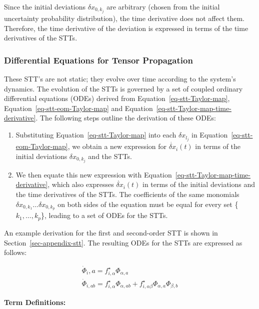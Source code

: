 \documentclass[
  letterpaper,
  DIV=11,
  numbers=noendperiod,
  oneside]{scrartcl}
\begin{document}
Since the initial deviations \(\delta x_{0,k_j}\) are arbitrary (chosen
from the initial uncertainty probability distribution), the time
derivative does not affect them. Therefore, the time derivative of the
deviation is expressed in terms of the time derivatives of the STTs.

\subsubsection{Differential Equations for Tensor
Propagation}\label{sec-stt-ode}

These STT's are not static; they evolve over time according to the
system's dynamics. The evolution of the STTs is governed by a set of
coupled ordinary differential equations (ODEs) derived from
Equation~\ref{eq-stt-Taylor-map}, Equation~\ref{eq-stt-eom-Taylor-map}
and Equation~\ref{eq-stt-Taylor-map-time-derivative}. The following
steps outline the derivation of these ODEs:

\begin{enumerate}
\def\labelenumi{\arabic{enumi}.}
\item
  Substituting Equation~\ref{eq-stt-Taylor-map} into each
  \(\delta x_{l_j}\) in Equation~\ref{eq-stt-eom-Taylor-map}, we obtain
  a new expression for \(\dot{\delta x}_i(t)\) in terms of the initial
  deviations \(\delta x_{0,k_j}\) and the STTs.
\item
  We then equate this new expression with
  Equation~\ref{eq-stt-Taylor-map-time-derivative}, which also expresses
  \(\dot{\delta x}_i(t)\) in terms of the initial deviations and the
  time derivatives of the STTs. The coefficients of the same monomials
  \(\delta x_{0,k_1} \dots \delta x_{0,k_p}\) on both sides of the
  equation must be equal for every set \{\(k_1,\dots, k_p\)\}, leading
  to a set of ODEs for the STTs.
\end{enumerate}

An example derivation for the first and second-order STT is shown in
Section~\ref{sec-appendix-stt}. The resulting ODEs for the STTs are
expressed as follows:

\[
\begin{aligned}
\dot{\Phi}_i,a= f_{i,\alpha}^\star \Phi_{\alpha,a} \\
\dot{\Phi}_{i,ab} = f_{i,\alpha}^\star \Phi_{\alpha,ab} + f_{i,\alpha\beta}^\star \Phi_{\alpha,a} \Phi_{\beta,b}
\end{aligned}
\]

\textbf{Term Definitions:}
\end{document}
